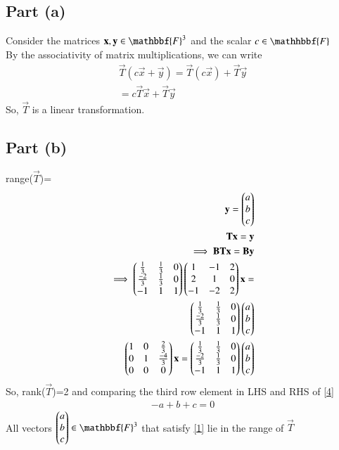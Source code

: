 \documentclass[journal,12pt,twocolumn]{IEEEtran}
\begin{document}
\subsection{Part (a)}
Consider the matrices $\vec{x},\vec{y} \in \mathbbf{F}^3$ and the scalar $c \in \mathhbbf{F}$\\
By the associativity of matrix multiplications, we can write
\begin{align}
    \vec{T}(c\vec{x}+\vec{y})=\vec{T}(c\vec{x})+\vec{T}\vec{y}\\
    =c\vec{T}\vec{x}+\vec{T}\vec{y}
\end{align}
So, $\vec{T}$ is a linear transformation.
\subsection{Part (b)}
range($\vec{T}$)=
\begin{align}
    \mathbf{y}=\begin{pmatrix}a\\b\\c\end{pmatrix}\\
    \mathbf{T}\mathbf{x}=\mathbf{y}\\
    \implies \mathbf{B}\mathbf{T}\mathbf{x}=\mathbf{B}\mathbf{y}\\
    \implies \begin{pmatrix}\frac{1}{3}&\frac{1}{3}&0\\\frac{-2}{3}&\frac{1}{3}&0\\-1&1&1\end{pmatrix}\begin{pmatrix}1&-1&2\\2&1&0\\-1&-2&2\end{pmatrix}\mathbf{x}=\\ \begin{pmatrix}\frac{1}{3}&\frac{1}{3}&0\\\frac{-2}{3}&\frac{1}{3}&0\\-1&1&1\end{pmatrix}\begin{pmatrix}a\\b\\c\end{pmatrix}\\
    \begin{pmatrix}1&0&\frac{2}{3}\\0&1&\frac{-4}{3}\\0&0&0\end{pmatrix}\mathbf{x}=\begin{pmatrix}\frac{1}{3}&\frac{1}{3}&0\\\frac{-2}{3}&\frac{1}{3}&0\\-1&1&1\end{pmatrix}\begin{pmatrix}a\\b\\c\end{pmatrix}\label{4}
\end{align}
So, rank($\vec{T}$)=2 and comparing the third row element in LHS and RHS of \eqref{4}
\begin{align}
  -a+b+c=0 \label{1} 
\end{align}
All vectors $\myvec{a\\b\\c} \in \mathbbf{F}^3$ that satisfy \eqref{1} lie in the range of $\vec{T}$
\end{document}
